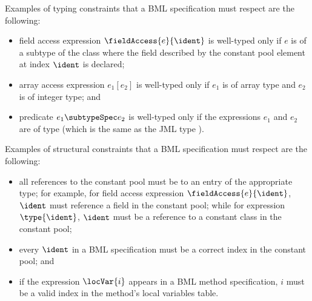 Examples of typing constraints that a BML specification must
respect are the following:
\begin{itemize}
\item field access expression
    $\fieldAccess{e}{\ident}$ is well-typed only if $e$ is
    of a subtype of the class where the field described by the constant
    pool element at index $\ident$ is declared; 

\item array access expression
$e_1[e_2]$ is well-typed only if $e_1$ is of array
type and $e_2$ is of integer type; and


    

\item predicate $e_1 \subtypeSpec e_2$ is well-typed only if the 
expressions $e_1$ and $e_ 2$ are of type 
(which is the same as the JML type \TYPE).


	  
\end{itemize}

Examples of structural constraints that a BML specification must
respect are the following: 
\begin{itemize}
\item all references to the constant pool must be to an entry of the
appropriate type; for example, for field access expression
$\fieldAccess{e}{\ident}$, $\ident$ must reference a
field in the constant pool; while for expression $\type{\ident}$,
\(\ident\) must be a reference to a constant class in the
constant pool;
    
\item every $\ident$ in a BML specification must be a correct
index in the constant pool; and
    
\item if the expression $\locVar{i}$ appears in a BML method 
specification, $i$ must be a valid index in the method's local
variables table.
\end{itemize}

